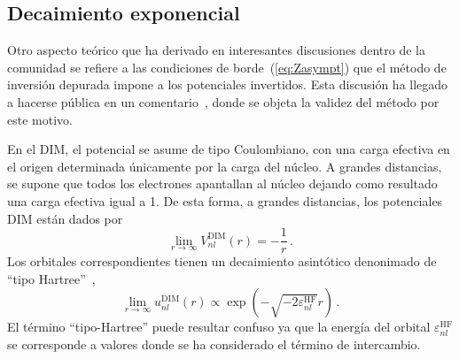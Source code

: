 \begin{comment}
En general, los orbitales OPM coinciden excelentemente con HF; sin embargo, las energías
OPM de los capas internas siempre están por arriba de las de HF.

En este experimento se utilizó el método lineal de pasos múltiples de 
Adams--Moulton para las ecuaciones diferenciales y el método de 
diferenciación Lagrangiana para las derivadas. La metodología se aplicó 
modificando el código \textsc{nrhf} de Johnson~\cite{Johnson:07}.

Por otro lado, es posible que la no localidad del método de 
Hartree--Fock sea responsable de que los nodos genuinos de los orbitales 
no sean puntos de inflexión. La excelente reproducción de los orbitales 
HF mediante el potencial local OPM parece sugerir que esta premisa es 
correcta. En este punto, los potenciales DIM tienen una gran ventaja, ya 
que son locales, reproducen las soluciones de HF de forma precisa, no 
sólo los radios medios de los orbitales sino también las energías de 
todos los orbitales (a diferencia de OPM, que sólo reproduce las 
energías de valencia).
\end{comment}

\subsection{Decaimiento exponencial}
\label{subsec:decaimientoHF}

Otro aspecto teórico que ha derivado en interesantes discusiones dentro 
de la comunidad se refiere a las condiciones de borde~(\ref{eq:Zasympt}) 
que el método de inversión depurada impone a los potenciales invertidos. 
Esta discusión ha llegado a hacerse pública en un 
comentario~\cite{Cinal:19}, donde se objeta la validez del método por 
este motivo.

En el DIM, el potencial se asume de tipo Coulombiano, con una carga 
efectiva en el origen determinada únicamente por la carga del núcleo. A 
grandes distancias, se supone que todos los electrones apantallan al 
núcleo dejando como resultado una carga efectiva igual a 1. De esta 
forma, a grandes distancias, los potenciales DIM están dados por
\begin{equation}
\lim_{r\rightarrow\infty} V_{nl}^{\mathrm{DIM}}(r) = -\frac{1}{r}\,.
\label{eq:VDIMasympt}
\end{equation}
Los orbitales correspondientes tienen un decaimiento asintótico 
denonimado de ``tipo Hartree''~\cite{Casida:89},
\begin{equation}
\lim_{r \rightarrow \infty} u_{nl}^{\mathrm{DIM}}(r) \propto
\exp(- \sqrt{- 2 \varepsilon_{nl}^{\mathrm{HF}} } r ) \,.
\label{eq:uDIMasympt}
\end{equation}
El término ``tipo-Hartree'' puede resultar confuso ya que la energía 
del orbital $\varepsilon_{nl}^{\mathrm{HF}}$ se corresponde a valores 
donde se ha considerado el término de intercambio. 

